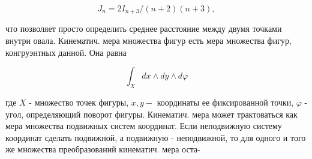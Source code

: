 \documentclass[10pt]{article}
\begin{document}
\[

J_{n}=2 I_{n+3} /(n+2)(n+3),

\]



что позволяет просто определить среднее расстояние между двумя точками внутри овала. Кинематич. мера множества фигур есть мера множества фигур, конгруэнтных данной. Она равна



\[

\int_{X} d x \wedge d y \wedge d \varphi

\]



где $X$ - множество точек фигуры, $x, y-$ координаты ее фиксированной точки, $\varphi$ - угол, определяющий поворот фигуры. Кинематич. мера может трактоваться как мера множества подвижных систем координат. Если неподвижную систему координат сделать подвижной, а подвижную - неподвижной, то для одного и того же множества преобразований кинематич. мера оста-
\end{document}
